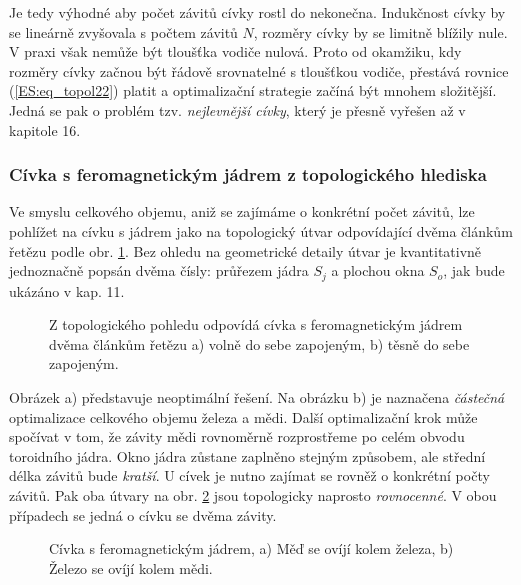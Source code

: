         Je tedy výhodné aby počet závitů cívky rostl do nekonečna. Indukčnost cívky by se lineárně 
        zvyšovala s počtem závitů \(N\), rozměry cívky by se limitně blížily nule. V praxi však 
        nemůže být tloušťka vodiče nulová. Proto od okamžiku, kdy rozměry cívky začnou být řádově 
        srovnatelné s tloušťkou vodiče, přestává rovnice (\ref{ES:eq_topol22}) platit a 
        optimalizační strategie začíná být mnohem složitější. Jedná se pak o problém tzv. 
        \emph{nejlevnější cívky}, který je přesně vyřešen až v kapitole 16.
      
      \subsubsection{Cívka s feromagnetickým jádrem z topologického hlediska}
        Ve smyslu celkového objemu, aniž se zajímáme o konkrétní počet závitů, lze pohlížet na 
        cívku s jádrem jako na topologický útvar odpovídající dvěma článkům řetězu podle obr. 
        \ref{es:fig_patocka_topol26}. Bez ohledu na geometrické detaily útvar je kvantitativně 
        jednoznačně popsán dvěma čísly: průřezem jádra \(S_j\) a plochou okna \(S_o\), jak bude 
        ukázáno v kap. 11.
        \begin{figure}[ht!]
          \centering  
          \caption{Z topologického pohledu odpovídá cívka s feromagnetickým jádrem dvěma článkům 
                  řetězu a) volně do sebe zapojeným, b) těsně do sebe zapojeným. 
                  \cite[s.~61]{Patocka4}} 
          \label{es:fig_patocka_topol26}
        \end{figure} 
        Obrázek a) představuje neoptimální řešení. Na obrázku b) je naznačena \emph{částečná} 
        optimalizace celkového objemu železa a mědi. Další optimalizační krok může spočívat v tom, 
        že závity mědi rovnoměrně rozprostřeme po celém obvodu toroidního jádra. Okno jádra zůstane 
        zaplněno stejným způsobem, ale střední délka závitů bude \emph{kratší}. U cívek je nutno 
        zajímat se rovněž o konkrétní počty závitů. Pak oba útvary na obr. 
        \ref{es:fig_patocka_topol27} jsou topologicky naprosto \emph{rovnocenné}. V obou případech 
        se jedná o cívku se dvěma závity. 
        \begin{figure}[ht!]
          \centering  
          \caption{Cívka s feromagnetickým jádrem, a) Měď se ovíjí kolem železa, b) Železo se ovíjí
            kolem mědi. \cite[s.~61]{Patocka4}} 
          \label{es:fig_patocka_topol27}
        \end{figure} 
        
